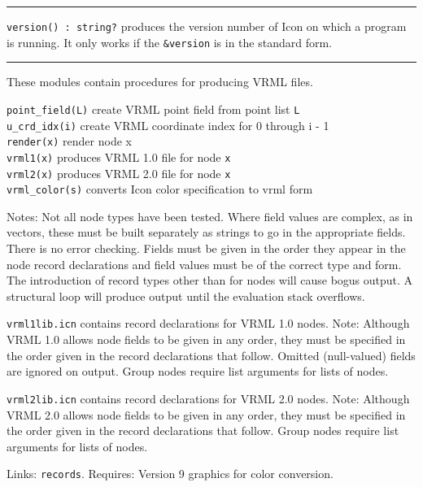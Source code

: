 \vspace{0.25cm}\hrule{}

\texttt{version}\texttt{() : string?} produces the
version number of Icon on which a program is running. It only works if
the \texttt{\&version} is in the standard form. 

\vspace{0.25cm}\hrule{}

These modules contain procedures for producing VRML files.

\texttt{point\_field(L)} create VRML point field from point list
\texttt{L\\
u\_crd\_idx(i)} create VRML coordinate index for 0 through i - 1\\
\texttt{render(x)} render node x\\
\texttt{vrml1(x)} produces VRML 1.0 file for node \texttt{x\\
vrml2(x)} produces VRML 2.0 file for node \texttt{x\\
vrml\_color(s)} converts Icon color specification to vrml form

Notes: Not all node types have been tested. Where field values are
complex, as in vectors, these must be built separately as strings to go
in the appropriate fields. There is no error checking. Fields must be
given in the order they appear in the node record declarations and
field values must be of the correct type and form. The introduction of
record types other than for nodes will cause bogus output. A structural
loop will produce output until the evaluation stack
overflows.

\texttt{vrml1lib.icn} contains record declarations for VRML 1.0 nodes.
Note: Although VRML 1.0 allows node fields to be given in any order,
they must be specified in the order given in the record declarations
that follow. Omitted (null-valued) fields are ignored on output. Group
nodes require list arguments for lists of nodes.

\texttt{vrml2lib.icn} contains record declarations for VRML 2.0 nodes.
Note: Although VRML 2.0 allows node fields to be given in any order,
they must be specified in the order given in the record declarations
that follow. Group nodes require list arguments for lists of nodes. 

Links: \texttt{records}. Requires: Version 9 graphics for color
conversion. 

